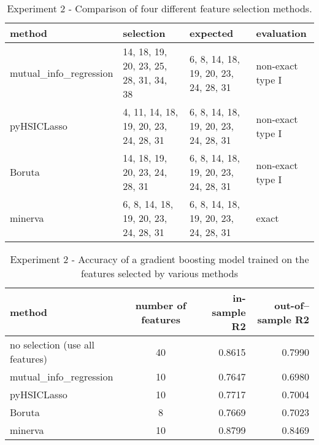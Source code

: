 \begin{table}
	\centering
{
	\begin{tabular}{l|l|l|l}
		\textbf{method}
		&
		\textbf{selection}
		&
		\textbf{expected}
		&
		\textbf{evaluation}
		\\
		\hline
		mutual\_info\_regression
		&
		\tiny{
		14, 18, 19, 20, 23, 25, 28, 31, 34, 38
	}
		& 
		\tiny{
		6, 8, 14, 18, 19, 20, 23, 24, 28, 31
	}
		&
		non-exact type I
		\\
		pyHSICLasso
		&
		\tiny{
		4, 11, 14, 18, 19, 20, 23, 24, 28, 31
	}
		& 
		\tiny{
		6, 8, 14, 18, 19, 20, 23, 24, 28, 31
	}
		&
		non-exact type I
		\\
		Boruta
		&
		\tiny{
		14, 18, 19, 20, 23, 24, 28, 31
	}
		& 
		\tiny{
		6, 8, 14, 18, 19, 20, 23, 24, 28, 31
	}
		&
		non-exact type I
		\\
		minerva
		& 
		\tiny{
		6, 8, 14, 18, 19, 20, 23, 24, 28, 31
	}
		&
		\tiny{
		6, 8, 14, 18, 19, 20, 23, 24, 28, 31
	}
		&
		exact
	\end{tabular}
}
\caption{Experiment 2 - Comparison of four different feature selection methods.}
\label{tab.experiment2}
\end{table}


\begin{table}
	\centering
{
	\begin{tabular}{l|c|r|r}
		\textbf{method}
		&
		\textbf{number of features}
		&
		\textbf{in-sample R2}
		&
		\textbf{out-of--sample R2}
		\\
		\hline
		no selection (use all features)
		&
		40
		&
		0.8615
		&
		0.7990
		\\
		mutual\_info\_regression
		&
		10
		&
		0.7647
		& 
		0.6980
		\\
		pyHSICLasso
		&
		10
		& 
		0.7717
		&
		0.7004
		\\
		Boruta
		&
		8
		& 
		0.7669
		&
		0.7023
		\\
		minerva
		& 
		10
		&
		0.8799
		&
		0.8469
	\end{tabular}
}
\caption{Experiment 2 - Accuracy of a gradient boosting model trained on the features selected by various methods}
\label{tab.experiment2accuracy}
\end{table}

